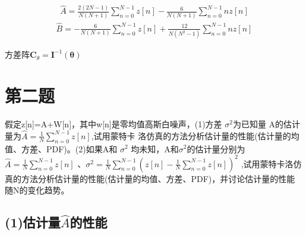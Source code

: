 \documentclass[fontset=windows]{article}
\numberwithin{figure}{section}
\begin{document}
\begin{align*}
	\hat{A}=\frac{2(2N-1)}{N(N+1)}\sum_{n=0}^{N-1}z[n]-\frac{6}{N(N+1)}\sum_{n=0}^{N-1}nz[n]
\end{align*}
\begin{align*}
	\hat{B}=-\frac{6}{N(N+1)}\sum_{n=0}^{N-1}z[n]+\frac{12}{N(N^2-1)}\sum_{n=0}^{N-1}nz[n]
\end{align*}

方差阵\(\mathbf{C}_{\theta}=\mathbf{I}^{-1}(\boldsymbol{\theta})\)

\section{第二题}
假定z[n]=A+W[n]，其中w[n]是零均值高斯白噪声，(1)方差 \(\sigma^2\)为已知量
A的估计量为\(\hat{A}=\frac{1}{N}\sum_{n = 0}^{N-1}z[n] \),试用蒙特卡
洛仿真的方法分析估计量的性能(估计量的均值、方差、PDF)。(2)如果A和 \(\sigma^2\)
均未知，A和\(\sigma^2\)的估计量分别为\(\hat{A}=\frac{1}{N}\sum_{n=0}^{N-1}z[n]\)
、\(\sigma^2=\frac{1}{N}\sum_{n=0}^{N-1}(z[n]-\frac{1}{N}\sum_{n=0}^{N-1}z[n])^2\)
,试用蒙特卡洛仿真的方法分析估计量的性能(估计量的均值、方差、PDF)，并讨论估计量的性能
随N的变化趋势。

\subsection*{(1)估计量\(\hat{A}\)的性能}
\end{document}
